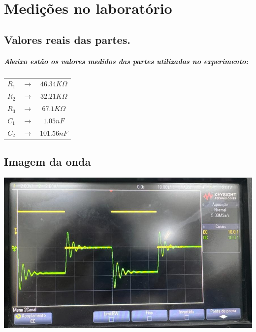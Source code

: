 \documentclass[12pt,twoside, a4paper, twocolumn]{article}
\begin{document}
{\newpage

\clearpage

\section{Medições no laboratório}

\subsection{Valores reais das partes.}
\subparagraph*{Abaixo estão os valores medidos das partes utilizadas no experimento:}

\begin{center}
    \begin{tabular}{ |ccc| }
        \hline
        $R_1$ & $\rightarrow$ & $46.34K\varOmega$ \\
        $R_2$ & $\rightarrow$ & $32.21K\varOmega$ \\
        $R_3$ & $\rightarrow$ & $67.1K\varOmega$  \\
        $C_1$ & $\rightarrow$ & $1.05nF$          \\
        $C_2$ & $\rightarrow$ & $101.56nF$        \\

        \hline
    \end{tabular}
\end{center}

\subsection{Imagem da onda}

\begin{adjustbox}{scale=0.25}
    \includegraphics{Figure_1.png}
\end{adjustbox}

}
\end{document}
